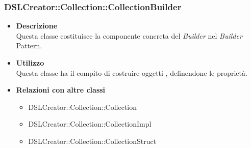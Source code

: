 \subsubsection{DSLCreator::Collection::CollectionBuilder}
                    \begin{itemize}
                        \item \textbf{Descrizione} \hfill \\
                            Questa classe costituisce la componente concreta del \textit{Builder} nel \textit{Builder} Pattern.
                        \item \textbf{Utilizzo} \hfill \\
                            Questa classe ha il compito di costruire oggetti , definendone le proprietà.
                        \item \textbf{Relazioni con altre classi}
                            \begin{itemize}
                              \item DSLCreator::Collection::Collection
                              \item DSLCreator::Collection::CollectionImpl
                              \item DSLCreator::Collection::CollectionStruct
                            \end{itemize}
                    \end{itemize}

